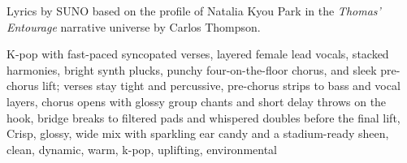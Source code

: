 
\begin{notes}
Lyrics by SUNO based on the profile of Natalia Kyou Park in the \emph{Thomas’ Entourage} narrative universe by Carlos Thompson.
\end{notes}
\begin{style}
K-pop with fast-paced syncopated verses, layered female lead vocals, stacked harmonies, bright synth plucks, punchy four-on-the-floor chorus, and sleek pre-chorus lift; verses stay tight and percussive, pre-chorus strips to bass and vocal layers, chorus opens with glossy group chants and short delay throws on the hook, bridge breaks to filtered pads and whispered doubles before the final lift, Crisp, glossy, wide mix with sparkling ear candy and a stadium-ready sheen, clean, dynamic, warm, k-pop, uplifting, environmental
\end{style}
